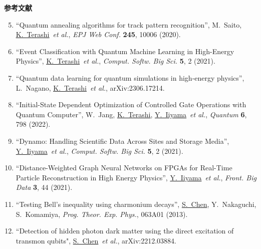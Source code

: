 \documentclass[11pt,a4j,dvipdfmx]{jarticle} 					%
\newcommand{\研究課題名}{誤り耐性量子コンピュータに向けた誤り訂正技術の開発(仮)}
\newcommand{\研究機関名}{東京大学}
\newcommand{\研究代表者氏名}{寺師弘二}
\newcommand{\me}{\underline{\underline{K.~Terashi}}}
\newcommand{\研究期間の最終元号年度}{10}  %
\newcommand{\iiyama}{\underline{Y.~Iiyama}}
\newcommand{\chen}{\underline{S.~Chen}}
\begin{document}
\vspace*{1zw}
\noindent\textbf{参考文献} \vspace{-2mm}
\begin{enumerate}
	\setcounter{enumi}{4}
	\renewcommand{\labelenumi}{[\arabic{enumi}]}
	\item \label{Saito_CHEP} ``Quantum annealing algorithms for track pattern recognition'',
		M.~Saito, \me\ {\it et al.}, {\it EPJ Web Conf.} {\bf 245}, 10006 (2020).\vspace{-3mm}
	\item \label{Terashi_QML_selection} ``Event Classification with Quantum Machine Learning in High-Energy Physics'', 
		\me\ {\it et al.}, {\it Comput. Softw. Big Sci.} {\bf 5}, 2 (2021).\vspace{-3mm}
	\item \label{Terashi_QML_Qdata} ``Quantum data learning for quantum simulations in high-energy physics'', 
	L.~Nagano, \me\ {\it et al.}, arXiv:2306.17214.\vspace{-3mm}
	\item \label{Terashi_AQCEL} ``Initial-State Dependent Optimization of Controlled Gate Operations with Quantum Computer'', 
		W.~Jang, \me, \iiyama\  {\it et al.}, {\it Quantum} {\bf 6}, 798 (2022).\vspace{-3mm}	
	\item \label{Iiyama_Dynamo} ``Dynamo: Handling Scientific Data Across Sites and Storage Media'',
		\iiyama\ {\it et al.},  {\it Comput. Softw. Big Sci.} {\bf 5}, 2 (2021).\vspace{-3mm}
	\item \label{Iiyama_GNN} ``Distance-Weighted Graph Neural Networks on FPGAs for Real-Time Particle Reconstruction in High Energy Physics'',
		\iiyama\ {\it et al.}, {\it Front. Big Data} {\bf 3}, 44 (2021).\vspace{-3mm}
	\item \label{Chen_QM} ``Testing Bell's inequality using charmonium decays'', 
		\chen, Y.~Nakaguchi, S.~Komamiya, {\it Prog. Theor. Exp. Phys.}, 063A01 (2013).\vspace{-3mm}
	\item \label{Chen_DM} ``Detection of hidden photon dark matter using the direct excitation of transmon qubits",
		\chen\ {\it et al.}, arXiv:2212.03884.
\end{enumerate}
\end{document}
